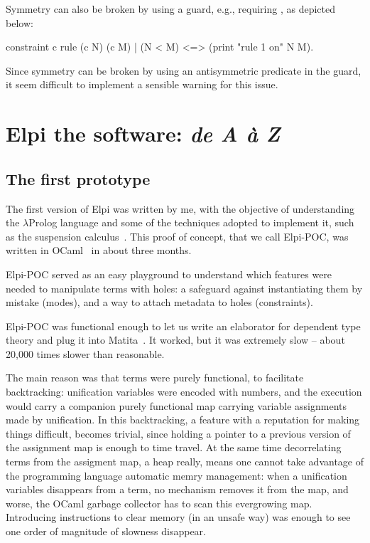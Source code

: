\documentclass[a4paper, 11pt]{book}
\begin{document}
Symmetry can also be broken by using a guard, e.g., requiring
, as depicted below:

\begin{elpicodelj}
constraint c {
  rule (c N) (c M) | (N < M) <=>
    (print "rule 1 on" N M).
}
\end{elpicodelj}
Since symmetry can be broken by using an antisymmetric predicate in the
guard, it seem difficult to implement a sensible warning for
this issue.


\chapter{Elpi the software: \emph{de A \`a Z}}

\section{The first prototype}\label{sec:poc}


The first version of Elpi was written by me, with the
objective of understanding the $\lambda$Prolog language and some of the
techniques adopted to implement it, such as the suspension
calculus~\cite{NADATHUR200235}. This proof of concept, that we call Elpi-POC,
was written in OCaml~\cite{leroy3ocaml}  in about three months.

Elpi-POC served as an easy playground to understand which features were needed
to manipulate terms with holes: a safeguard against instantiating them by
mistake (modes), and a way to attach metadata to holes (constraints).


Elpi-POC was functional enough to let us write an elaborator for dependent type
theory and plug it into Matita~\cite{DBLP:conf/cade/AspertiRCT11}. It worked,
but it was extremely slow -- about 20,000 times slower than reasonable.


The main reason was that
terms were purely functional, to facilitate backtracking: unification
variables were encoded with numbers, and the execution would carry a
companion purely functional map carrying variable assignments made by unification.
In this backtracking, a feature with a
reputation for making things difficult, becomes trivial, since 
holding a pointer to a previous version of the assignment map is
enough to time travel. At the same time decorrelating terms from
the assigment map, a heap really, means one cannot take advantage of
the programming language automatic memry management: when a unification
variables disappears from a term, no mechanism removes it from the map,
and worse, the OCaml garbage collector has to scan this evergrowing
map.\\
Introducing instructions to clear memory (in an unsafe way) was enough to see
one order of magnitude of slowness disappear.
\end{document}
